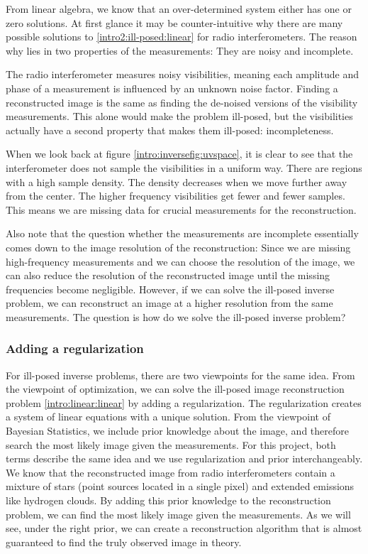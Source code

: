 From linear algebra, we know that an over-determined system either has one or zero solutions. At first glance it may be counter-intuitive why there are many possible solutions to \eqref{intro2:ill-posed:linear} for radio interferometers. The reason why lies in two properties of the measurements: They are noisy and incomplete.

The radio interferometer measures noisy visibilities, meaning each amplitude and phase of a measurement is influenced by an unknown noise factor. Finding a reconstructed image is the same as finding the de-noised versions of the visibility measurements. This alone would make the problem ill-posed, but the visibilities actually have a second property that makes them ill-posed: incompleteness.

When we look back at figure \ref{intro:inversefig:uvspace}, it is clear to see that the interferometer does not sample the visibilities in a uniform way. There are regions with a high sample density. The density decreases when we move further away from the center. The higher frequency visibilities get fewer and fewer samples. This means we are missing data for crucial measurements for the reconstruction.

Also note that the question whether the measurements are incomplete essentially comes down to the image resolution of the reconstruction: Since we are missing high-frequency measurements and we can choose the resolution of the image, we can also reduce the resolution of the reconstructed image until the missing frequencies become negligible. However, if we can solve the ill-posed inverse problem, we can reconstruct an image at a higher resolution from the same measurements. The question is how do we solve the ill-posed inverse problem?

\subsubsection{Adding a regularization} \label{intro:linear:regularization}
For ill-posed inverse problems, there are two viewpoints for the same idea. From the viewpoint of optimization, we can solve the ill-posed image reconstruction problem \eqref{intro:linear:linear} by adding a regularization. The regularization creates a system of linear equations with a unique solution. From the viewpoint of Bayesian Statistics, we include prior knowledge about the image, and therefore search the most likely image given the measurements. For this project, both terms describe the same idea and we use regularization and prior interchangeably. We know that the reconstructed image from radio interferometers contain a mixture of stars (point sources located in a single pixel) and extended emissions like hydrogen clouds. By adding this prior knowledge to the reconstruction problem, we can find the most likely image given the measurements. As we will see, under the right prior, we can create a reconstruction algorithm that is almost guaranteed to find the truly observed image in theory.

